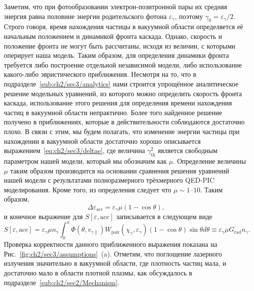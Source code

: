 Заметим, что при фотообразовании электрон-позитронной пары их средняя энергия равна половине энергии родительского фотона $\varepsilon_\gamma$, поэтому $\gamma_0 = \varepsilon_\gamma / 2$.
Строго говоря, время нахождения частицы в вакуумной области определяется её начальным положением и динамикой фронта каскада.
Однако, скорость и положение фронта не могут быть рассчитаны, исходя из величин, с которыми оперирует наша модель.
Таким образом, для определения динамики фронта требуется либо построение отдельной независимой модели, либо использование какого-либо эвристического приближения.
Несмотря на то, что в подразделе~\ref{sub:ch2/sec3/analytics} нами строится упрощённое аналитическое решение модельных уравнений, из которого можно определить скорость фронта каскада, использование этого решения для определения времени нахождения частиц в вакуумной области непрактично.
Более того найденное решение получено в приближениях, которые в действительности соблюдаются достаточно плохо.
В связи с этим, мы будем полагать, что изменение энергии частицы при нахождении в вакуумной области достаточно хорошо описывается выражением~\eqref{eq:ch2/sec3/deltae}, где величина $\gamma_\mathrm{th}^2$ является свободным параметром нашей модели, который мы обозначим как $\mu$.
Определение величины $\mu$ таким образом производится на основании сравнения решения уравнений нашей модели с результатами полноразмерного трёхмерного QED-PIC моделирования.
Кроме того, из определения следует что $\mu \sim \numrange{1}{10}$.
Таким образом, 
\begin{equation}
    \label{eq:ch2/sec3/deltae_fin}
    \Delta\varepsilon_\mathrm{acc} = \varepsilon_\gamma \mu (1 - \cos\theta),
\end{equation}
и конечное выражение для $S[\varepsilon, \mathrm{acc}]$ записывается в следующем виде
\begin{equation}
    \label{eq:ch2/jE}
    S[\varepsilon, \mathrm{acc}] =  \varepsilon_\gamma \mu n_\gamma \int_0^\pi \Phi(\theta, v_{\gamma\parallel}) W_\mathrm{pair}(\chi_\gamma, \varepsilon_\gamma) {\left( 1-\cos\theta \right)}\sin\theta d\theta  \equiv \varepsilon_\gamma \mu \overline{G_\mathrm{rad}} n_\gamma.
\end{equation}
Проверка корректности данного приближенного выражения показана на Рис.~\ref{fig:ch2/sec3/assumptions}~(a).
Отметим, что поглощение лазерного излучения значительно в вакуумной области, где плотность частиц мала, и достаточно мало в области плотной плазмы, как обсуждалось в подразделе~\ref{sub:ch2/sec2/Mechanism}.
